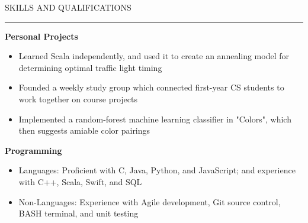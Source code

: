 \documentclass{report}
\begin{document}

\vspace{8pt} SKILLS AND QUALIFICATIONS
\vspace{4pt} \textcolor{gray}{\hrule}

\vspace{16pt} \textbf{Personal Projects}
\begin{itemize} [noitemsep,topsep=4pt]
	\item Learned Scala independently, and used it to create an annealing model for determining optimal traffic light timing
	\item Founded a weekly study group which connected first-year CS students to work together on course projects
	\item Implemented a random-forest machine learning classifier in "Colors", which then suggests amiable color pairings
\end{itemize}

\vspace{8pt} \textbf{Programming}
\begin{itemize} [noitemsep,topsep=4pt]
	\item Languages: Proficient with C, Java, Python, and JavaScript; and experience with C++, Scala, Swift, and SQL
	\item Non-Languages: Experience with Agile development, Git source control, BASH terminal, and unit testing
\end{itemize}

\end{document}
